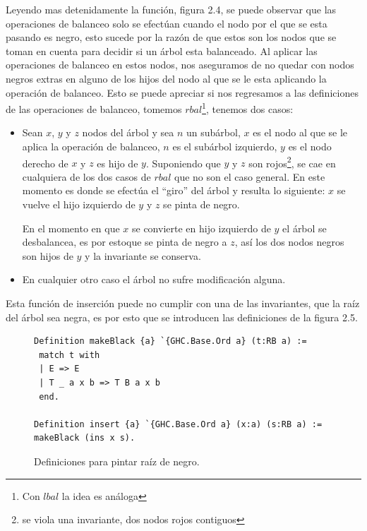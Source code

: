 \documentclass[8pt,leqno,pdflatex,spanish]{book}
\theoremstyle{plain}
\theoremstyle{definition}
\theoremstyle{remark}
\begin{document}
Leyendo mas detenidamente la funci\'on, figura 2.4, se puede observar que las operaciones de 
balanceo solo se efectúan cuando el nodo por el que se esta pasando es negro, esto sucede por la 
raz\'on de que estos son los nodos  que se toman en cuenta para decidir si un \'arbol esta 
balanceado. Al aplicar las operaciones de balanceo en estos nodos, nos aseguramos de no quedar con 
nodos negros extras en alguno de los hijos del nodo al que se le esta aplicando la operación de 
balanceo. Esto se puede apreciar si nos regresamos a las definiciones de las operaciones de 
balanceo, tomemos $rbal$\footnote{Con $lbal$ la idea es an\'aloga}, tenemos dos casos:

\begin{itemize}
    \item Sean $x$, $y$ y $z$ nodos del \'arbol y sea $n$ un subárbol, $x$ es el nodo al que se le 
    aplica la operaci\'on de balanceo, $n$ es el subárbol izquierdo, $y$ es el nodo derecho  de $x$
    y $z$ es hijo de $y$. Suponiendo que $y$ y $z$ son rojos\footnote{se viola una invariante, dos 
    nodos rojos contiguos}, se cae en cualquiera de los dos casos de $rbal$ que no son el caso 
    general. En este momento es donde se efectúa el ``giro'' del árbol y resulta lo siguiente: $x$ 
    se vuelve el hijo izquierdo de $y$ y $z$ se pinta de negro.
    
    En el momento en que $x$ se convierte en hijo izquierdo de $y$ el \'arbol se desbalancea, es 
    por estoque se pinta de negro a $z$, así los dos nodos negros son hijos de $y$ y la invariante 
    se conserva.
    \item En cualquier otro caso el \'arbol no sufre modificaci\'on alguna.
\end{itemize}{}

Esta función de inserción puede no cumplir con una de las invariantes, que la raíz del árbol sea 
negra, es por esto que se introducen las definiciones de la figura 2.5.

\begin{figure}
\centering 
\captionsetup{justification=centering}
\begin{verbatim}
Definition makeBlack {a} `{GHC.Base.Ord a} (t:RB a) :=
 match t with
 | E => E
 | T _ a x b => T B a x b
 end.

Definition insert {a} `{GHC.Base.Ord a} (x:a) (s:RB a) := makeBlack (ins x s).
\end{verbatim}
\caption{Definiciones para pintar ra\'iz de negro.}
\end{figure}
\end{document}
